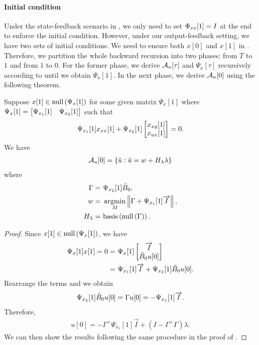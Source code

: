 \paragraph{Initial condition} Under the state-feedback scenario in \cite{tseng2020system}, we only need to set $\Phi_{xx}[1] = I$ at the end to enforce the initial condition. However, under our output-feedback setting, we have two sets of initial conditions. We need to ensure both $x[0]$ and $x[1]$ in . Therefore, we partition the whole backward recursion into two phases: from $T$ to $1$ and from $1$ to $0$. For the former phase, we derive $\mathcal{A}_u[\tau]$ and $\Psi_x[\tau]$ recursively according to  until we obtain $\Psi_x[1]$. In the next phase, we derive $\mathcal{A}_u[0]$ using the following theorem.

\begin{theorem}\label{thm:feasible_set0}
  Suppose $x[1] \in \text{\rm null}\left(\Psi_x[1]\right)$ for some given matrix $\Psi_x[1]$ where
  $
  \Psi_x[1] = \begin{bmatrix} \Psi_{x_1}[1] & \Psi_{x_2}[1] \end{bmatrix}
  $
  such that 
  \begin{align*}
  \Psi_{x_1}[1] x_{xx}[1] + \Psi_{x_2}[1] \begin{bmatrix}x_{xy}[1] \\ x_{ux}[1]\end{bmatrix} = 0.
  \end{align*}
   We have
  \begin{align*}
    \mathcal{A}_u[0] = \{ \hat{u} : \hat{u} = w + H_\lambda \lambda \}
  \end{align*}
  where 
  \begin{align*}
    \Gamma =&\ \Psi_{x_2}[1] \tilde{B}_0, \\ 
    w =&\ \operatorname*{argmin}_{M} \left\lVert \Gamma + \Psi_{x_1}[1] \overrightarrow{I} \right\rVert, \\
    H_\lambda =&\ \text{\rm basis}\left(\text{\rm null}\left(\Gamma\right)\right).
  \end{align*}
\end{theorem}

\begin{proof}
Since $x[1] \in \text{\rm null}\left(\Psi_x[1]\right)$, we have 
\begin{align*}
\Psi_x[1] x[1] = 0 
=&\ \Psi_x[1] \begin{bmatrix}\overrightarrow{I}\\ \tilde{B}_0 u[0] \end{bmatrix}\\
=&\ \Psi_{x_1}[1] \overrightarrow{I} + \Psi_{x_2}[1] \tilde{B}_0 u[0].
\end{align*}
Rearrange the terms and we obtain
\begin{align*}
 \Psi_{x_2}[1] \tilde{B}_0 u[0] = \Gamma u[0] = - \Psi_{x_1}[1] \overrightarrow{I}.
\end{align*}
Therefore,
\begin{align*}
u[0] = - \Gamma^+ \Psi_{x_1}[1] \vec{I} + (I - \Gamma^+\Gamma) \lambda.
\end{align*}
We can then show the results following the same procedure in the proof of .
\end{proof}

